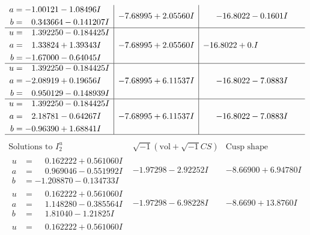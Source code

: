 \documentclass[1p]{elsarticle_modified}
\theoremstyle{definition}
\newcommand{\I}{\sqrt{-1}}
\begin{document}
$$\begin{array}{c|c|c}
\begin{aligned}
a &= -1.00121 - 1.08496 I \\
b &= \phantom{-}0.343664 - 0.141207 I\end{aligned}
 & -7.68995 + 2.05560 I & -16.8022 - 0.1601 I \\ \hline\begin{aligned}
u &= \phantom{-}1.392250 - 0.184425 I \\
a &= \phantom{-}1.33824 + 1.39343 I \\
b &= -1.67000 - 0.64045 I\end{aligned}
 & -7.68995 + 2.05560 I & -16.8022 + 0. I\phantom{ +0.000000I} \\ \hline\begin{aligned}
u &= \phantom{-}1.392250 - 0.184425 I \\
a &= -2.08919 + 0.19656 I \\
b &= \phantom{-}0.950129 - 0.148939 I\end{aligned}
 & -7.68995 + 6.11537 I & -16.8022 - 7.0883 I \\ \hline\begin{aligned}
u &= \phantom{-}1.392250 - 0.184425 I \\
a &= \phantom{-}2.18781 - 0.64267 I \\
b &= -0.96390 + 1.68841 I\end{aligned}
 & -7.68995 + 6.11537 I & -16.8022 - 7.0883 I\\
 \hline 
 \end{array}$$\newpage$$\begin{array}{c|c|c}  
\text{Solutions to }I^u_{2}& \I (\text{vol} + \sqrt{-1}CS) & \text{Cusp shape}\\
 \hline 
\begin{aligned}
u &= \phantom{-}0.162222 + 0.561060 I \\
a &= \phantom{-}0.969046 - 0.551992 I \\
b &= -1.208870 - 0.134733 I\end{aligned}
 & -1.97298 - 2.92252 I & -8.66900 + 6.94780 I \\ \hline\begin{aligned}
u &= \phantom{-}0.162222 + 0.561060 I \\
a &= \phantom{-}1.148280 - 0.385564 I \\
b &= \phantom{-}1.81040 - 1.21825 I\end{aligned}
 & -1.97298 - 6.98228 I & -8.6690 + 13.8760 I \\ \hline\begin{aligned}
u &= \phantom{-}0.162222 + 0.561060 I \\

\end{aligned}
\end{array}$$
\end{document}
